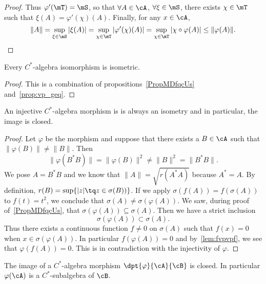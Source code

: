 \begin{proof}
	Thus $\varphi'(\mT)=\mS$, so that $\forall A\in\cA$, $\forall\xi\in\mS$, there exists $\chi\in\mT$ such that $\xi(A)=\varphi'(\chi)(A)$. Finally, for any $x\in\cA$,
	\begin{equation}
		\|A\|=\sup_{\xi\in\mS}|\xi(A)|
		=\sup_{\chi\in\mT}|\varphi'(\chi)(A)|
		=\sup_{\chi\in\mT}|\chi\circ\varphi(A)|
		\leq\|\varphi(A)\|.
	\end{equation}

\end{proof}

\begin{proposition}
	Every \( C^*\)-algebra isomorphism is isometric.
\end{proposition}

\begin{proof}
	This is a combination of propositions~\ref{PropMDfqcUs} and~\ref{prop:vp_geq}.
\end{proof}

\begin{lemma}  \label{lem:injmorpisom}
	An injective $C^*$-algebra morphism is is always an isometry and in particular, the image is closed.
\end{lemma}

\begin{proof}
	Let $\varphi$ be the morphism and suppose that there exists a $B\in\cA$ such that $\| \varphi(B) \|\neq \| B \|$. Then
	\[
		\| \varphi(B^*B) \|=\| \varphi(B) \|^2\neq\| B \|^2=\| B^*B \|.
	\]
	We pose $A=B^*B$ and we know that $\| A \|=\sqrt{r(A^*A)}$ because $A^*=A$. By definition, $r(B)=\sup\{ | z |\tq z\in\sigma(B)) \}$. If we apply $\sigma(f(A))=f(\sigma(A))$ to $f(t)=t^2$, we conclude that $\sigma(A)\neq\sigma(\varphi(A))$. We saw, during proof of~\ref{PropMDfqcUs}, that $\sigma(\varphi(A))\subseteq\sigma(A)$. Then we have a strict inclusion
	\[
		\sigma(\varphi(A))\subset\sigma(A).
	\]
	Thus there exists a continuous function $f\neq 0$ on $\sigma(A)$ such that $f(x)=0$ when $x\in\sigma(\varphi(A))$. In particular $f(\varphi(A))=0$ and by~\ref{lem:fvpvpf}, we see that $\varphi(f(A))=0$. This is in contradiction with the injectivity of $\varphi$.

\end{proof}

\begin{corollary}
	The image of a $C^*$-algebra morphism $\dpt{\varphi}{\cA}{\cB}$ is closed. In particular $\varphi(\cA)$ is a $C^*$-subalgebra of $\cB$.
\end{corollary}

